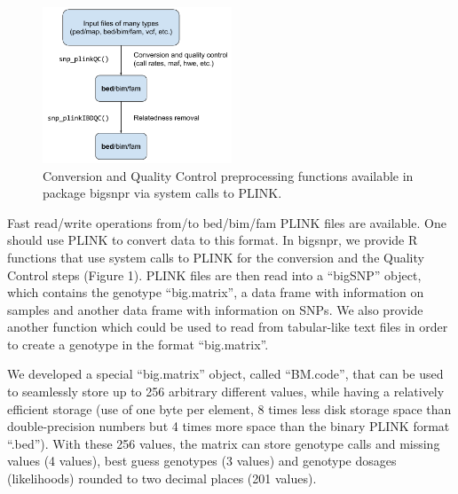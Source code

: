 \documentclass{bioinfo}
\begin{document}
\begin{methods}
\begin{figure}[!tpb]
\centerline{\includegraphics[width=160pt]{conversion+QC.pdf}}
\caption{Conversion and Quality Control preprocessing functions available in package bigsnpr via system calls to PLINK.}\label{fig:qc}
\end{figure}

Fast read/write operations from/to bed/bim/fam PLINK files are available. One should use PLINK to convert data to this format. In bigsnpr, we provide R functions that use system calls to PLINK for the conversion and the Quality Control steps (Figure 1). PLINK files are then read into a ``bigSNP'' object, which contains the genotype ``big.matrix'', a data frame with information on samples and another data frame with information on SNPs. We also provide another function which could be used to read from tabular-like text files in order to create a genotype in the format ``big.matrix''.

We developed a special ``big.matrix'' object, called ``BM.code'', that can be used to seamlessly store up to 256 arbitrary different values, while having a relatively efficient storage (use of one byte per element, 8 times less disk storage space than double-precision numbers but 4 times more space than the binary PLINK format ``.bed''). With these 256 values, the matrix can store genotype calls and missing values (4 values), best guess genotypes (3 values) and genotype dosages (likelihoods) rounded to two decimal places (201 values).


\end{methods}
\end{document}
